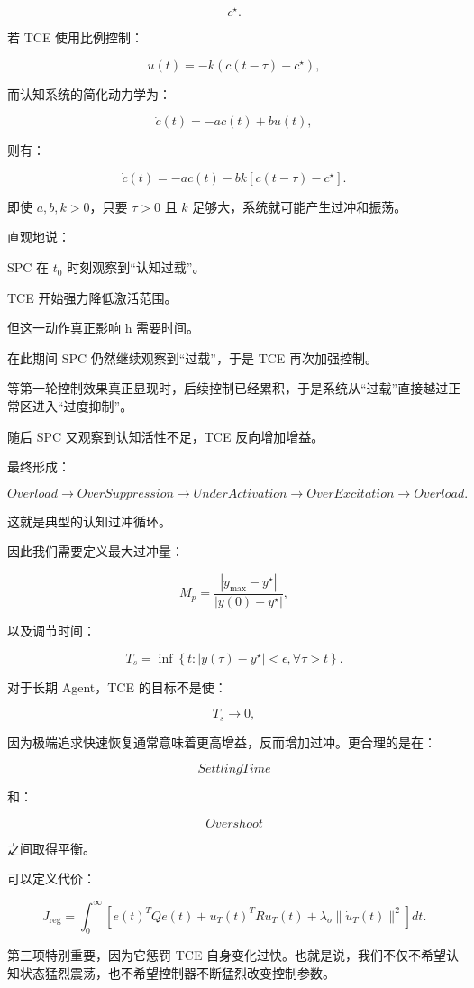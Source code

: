 \[
c^\star.
\]

若 TCE 使用比例控制：

\[
u(t)
=
-k(c(t-\tau)-c^\star),
\]

而认知系统的简化动力学为：

\[
\dot c(t)
=
-ac(t)+bu(t),
\]

则有：

\[
\dot c(t)
=
-ac(t)
-
bk
\left[
c(t-\tau)-c^\star
\right].
\]

即使 $a,b,k>0$，只要 $\tau>0$ 且 $k$ 足够大，系统就可能产生过冲和振荡。

直观地说：

SPC 在 $t_0$ 时刻观察到“认知过载”。

TCE 开始强力降低激活范围。

但这一动作真正影响 h 需要时间。

在此期间 SPC 仍然继续观察到“过载”，于是 TCE 再次加强控制。

等第一轮控制效果真正显现时，后续控制已经累积，于是系统从“过载”直接越过正常区进入“过度抑制”。

随后 SPC 又观察到认知活性不足，TCE 反向增加增益。

最终形成：

\[
Overload
\rightarrow
OverSuppression
\rightarrow
UnderActivation
\rightarrow
OverExcitation
\rightarrow
Overload.
\]

这就是典型的认知过冲循环。

因此我们需要定义最大过冲量：

\[
M_p
=
\frac{
|y_{\max}-y^\star|
}{
|y(0)-y^\star|
},
\]

以及调节时间：

\[
T_s
=
\inf
\left\{
t:
|y(\tau)-y^\star|<\epsilon,
\forall\tau>t
\right\}.
\]

对于长期 Agent，TCE 的目标不是使：

\[
T_s\rightarrow0,
\]

因为极端追求快速恢复通常意味着更高增益，反而增加过冲。更合理的是在：

\[
SettlingTime
\]

和：

\[
Overshoot
\]

之间取得平衡。

可以定义代价：

\[
J_{\mathrm{reg}}
=
\int_0^\infty
\left[
e(t)^TQe(t)
+
u_T(t)^TRu_T(t)
+
\lambda_o
\|\dot u_T(t)\|^2
\right]dt.
\]

第三项特别重要，因为它惩罚 TCE 自身变化过快。也就是说，我们不仅不希望认知状态猛烈震荡，也不希望控制器不断猛烈改变控制参数。


